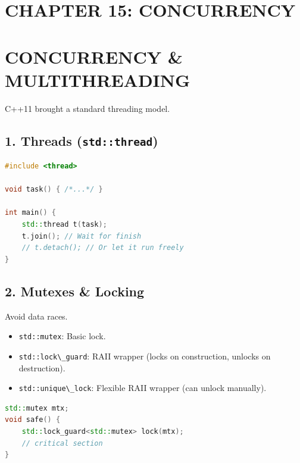 \hypertarget{chapter-15-concurrency}{%
\section{CHAPTER 15: CONCURRENCY}\label{chapter-15-concurrency}}

\hypertarget{concurrency-multithreading}{%
\section{CONCURRENCY \&
MULTITHREADING}\label{concurrency-multithreading}}

C++11 brought a standard threading model.

\hypertarget{threads-stdthread}{%
\subsection{\texorpdfstring{1. Threads
(\texttt{std::thread})}{1. Threads (std::thread)}}\label{threads-stdthread}}

\begin{lstlisting}[language={C++}]
#include <thread>

void task() { /*...*/ }

int main() {
    std::thread t(task);
    t.join(); // Wait for finish
    // t.detach(); // Or let it run freely
}
\end{lstlisting}

\hypertarget{mutexes-locking}{%
\subsection{2. Mutexes \& Locking}\label{mutexes-locking}}

Avoid data races.

\begin{itemize}
\tightlist
\item
  \passthrough{\lstinline!std::mutex!}: Basic lock.
\item
  \passthrough{\lstinline!std::lock\_guard!}: RAII wrapper (locks on
  construction, unlocks on destruction).
\item
  \passthrough{\lstinline!std::unique\_lock!}: Flexible RAII wrapper
  (can unlock manually).
\end{itemize}

\begin{lstlisting}[language={C++}]
std::mutex mtx;
void safe() {
    std::lock_guard<std::mutex> lock(mtx);
    // critical section
}
\end{lstlisting}

